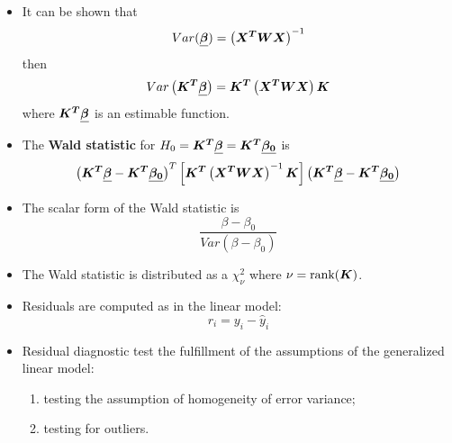 \begin{frame}
  \begin{itemize}
    \item It can be shown that 
      $$ Var(\boldsymbol{\underline{\beta}}) = \left( \boldsymbol{X^T} \boldsymbol{W} \boldsymbol{X} \right)^{-1} $$ 
      then
      $$ Var \left( \boldsymbol{K^T} \boldsymbol{\underline{\beta}} \right) = \boldsymbol{K^T} \left( \boldsymbol{X^T} \boldsymbol{W} \boldsymbol{X} \right) \boldsymbol{K} $$
      where $ \boldsymbol{K^T} \boldsymbol{\underline{\beta}} $ is an estimable function.
    \vspace{0.1cm}
    \item The \textbf{Wald statistic} for $ H_0 = \boldsymbol{K^T} \boldsymbol{\underline{\beta}} = \boldsymbol{K^T} \boldsymbol{\underline{\beta_0}} $ is
      $$ \left( \boldsymbol{K^T} \boldsymbol{\underline{\beta}} - \boldsymbol{K^T} \boldsymbol{\underline{\beta_0}} \right)^T \left[ \boldsymbol{K^T} \left( \boldsymbol{X^T} \boldsymbol{W} \boldsymbol{X} \right)^{-1} \boldsymbol{K} \right] \left( \boldsymbol{K^T} \boldsymbol{\underline{\beta}} - \boldsymbol{K^T} \boldsymbol{\underline{\beta_0}} \right) $$
    \item The scalar form of the Wald statistic is
      $$ \frac{\beta - \beta_0}{Var(\beta - \beta_0)} $$
    \item The Wald statistic is distributed as a $ \chi^2_{\nu} $ where $ \nu = \text{rank}(\boldsymbol{K}) $.
  \end{itemize}
\end{frame}




\begin{frame}
  \begin{itemize}
    \vspace{0.75cm}
    \item Residuals are computed as in the linear model:
      $$ r_i = y_i - \hat{y}_i $$
    \vspace{0.25cm}
    \item Residual diagnostic test the fulfillment of the assumptions of the generalized linear model:
      \begin{enumerate}
        \vspace{0.5cm}
        \item testing the assumption of homogeneity of error variance;
        \vspace{0.5cm}
        \item testing for outliers.
      \end{enumerate}
  \end{itemize}
\end{frame}

